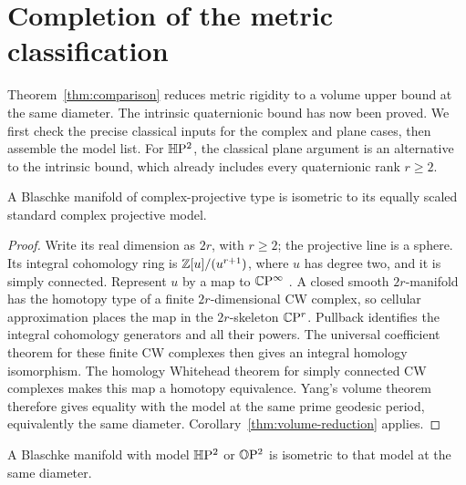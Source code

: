 \section{Completion of the metric classification}
\label{completion:section}

Theorem~\ref{thm:comparison} reduces metric rigidity to a volume
upper bound at the same diameter. The intrinsic quaternionic bound
has now been proved. We first check the precise classical inputs
for the complex and plane cases, then assemble the model list.
For $\mathbb H\mathrm P^2$, the classical plane argument is an alternative to the
intrinsic bound, which already includes every quaternionic rank $r\ge2$.

\begin{corollary}\label{rig:complex}
A Blaschke manifold of complex-projective type is isometric
to its equally scaled standard complex projective model.
\end{corollary}

\begin{proof}
Write its real dimension as $2r$, with $r\ge2$; the projective
line is a sphere. Its integral cohomology ring is
$\mathbb Z[u]/(u^{r+1})$, where $u$ has degree two, and it is simply
connected. Represent $u$ by a map to $\mathbb C\mathrm P^\infty$
\citep[Theorem~4.57]{Hatcher2002}. A closed
smooth $2r$-manifold has the homotopy type of a finite
$2r$-dimensional CW complex, so cellular approximation
\citep[Theorem~4.8]{Hatcher2002} places the map in the
$2r$-skeleton $\mathbb C\mathrm P^r$. Pullback identifies the integral
cohomology generators and all their powers. The universal
coefficient theorem for these finite CW complexes then gives
an integral homology isomorphism. The homology Whitehead
theorem for simply connected CW complexes
\citep[Corollary~4.33]{Hatcher2002} makes this map a homotopy
equivalence. Yang's volume theorem
\citep[Theorem, p.~380]{Yang1991} therefore gives equality with the model at the
same prime geodesic period, equivalently the same diameter.
Corollary~\ref{thm:volume-reduction} applies.
\end{proof}

\begin{corollary}\label{rig:planes}
A Blaschke manifold with model $\mathbb H\mathrm P^2$ or $\mathbb O\mathrm P^2$ is isometric
to that model at the same diameter.
\end{corollary}

